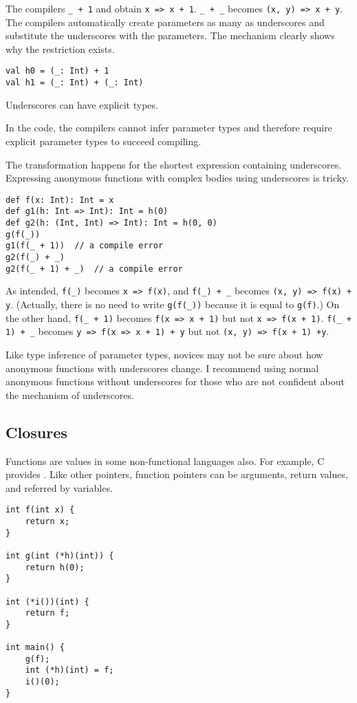 The compilers  \verb!_ + 1! and obtain \verb!x => x + 1!. \verb!_ + _!
becomes \verb!(x, y) => x + y!. The compilers automatically create parameters
as many as underscores and substitute the underscores with the parameters. The
mechanism clearly shows why the restriction exists.

\begin{verbatim}
val h0 = (_: Int) + 1
val h1 = (_: Int) + (_: Int)
\end{verbatim}

Underscores can have explicit types.

In the code, the compilers cannot infer parameter types and therefore require
explicit parameter types to succeed compiling.

The transformation happens for the shortest expression containing underscores.
Expressing anonymous functions with complex bodies using underscores is tricky.

\begin{verbatim}
def f(x: Int): Int = x
def g1(h: Int => Int): Int = h(0)
def g2(h: (Int, Int) => Int): Int = h(0, 0)
g(f(_))
g1(f(_ + 1))  // a compile error
g2(f(_) + _)
g2(f(_ + 1) + _)  // a compile error
\end{verbatim}

As intended, \verb!f(_)! becomes \verb!x => f(x)!, and \verb!f(_) + _! becomes
\verb!(x, y) => f(x) + y!. (Actually, there is no need to write \verb!g(f(_))!
because it is equal to \verb!g(f)!.) On the other hand, \verb!f(_ + 1)! becomes
\verb!f(x => x + 1)! but not \verb!x => f(x + 1)!. \verb!f(_ + 1) + _! becomes
\verb!y => f(x => x + 1) + y! but not \verb!(x, y) => f(x + 1) +y!.

Like type inference of parameter types, novices may not be sure about how
anonymous functions with underscores change. I recommend using normal anonymous
functions without underscores for those who are not confident about the mechanism
of underscores.

\subsection{Closures}

Functions are values in some non-functional languages also. For example, C
provides . Like other pointers, function pointers can be
arguments, return values, and referred by variables.

\begin{verbatim}
int f(int x) {
    return x;
}

int g(int (*h)(int)) {
    return h(0);
}

int (*i())(int) {
    return f;
}

int main() {
    g(f);
    int (*h)(int) = f;
    i()(0);
}
\end{verbatim}

